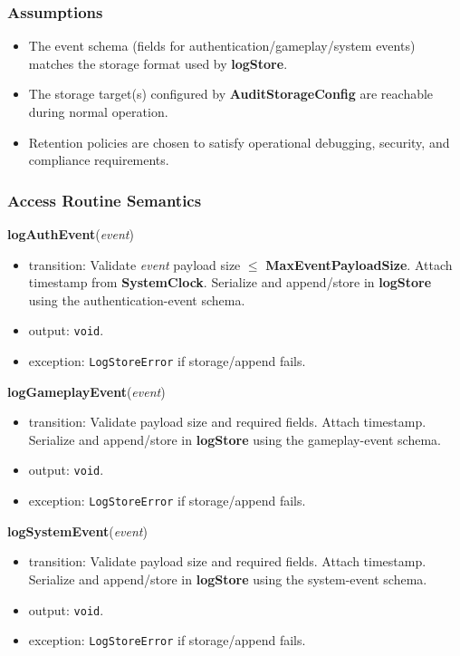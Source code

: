 \documentclass[12pt, titlepage]{article}
\begin{document}
\subsubsection{Assumptions}
\begin{itemize}
    \item The event schema (fields for authentication/gameplay/system events) matches the storage format used by \textbf{logStore}.
    \item The storage target(s) configured by \textbf{AuditStorageConfig} are reachable during normal operation.
    \item Retention policies are chosen to satisfy operational debugging, security, and compliance requirements.
\end{itemize}

\subsubsection{Access Routine Semantics}

\noindent\textbf{logAuthEvent}(\textit{event})
\begin{itemize}
    \item transition: Validate \textit{event} payload size $\le$ \textbf{MaxEventPayloadSize}. Attach timestamp from \textbf{SystemClock}. Serialize and append/store in \textbf{logStore} using the authentication-event schema.
    \item output: \texttt{void}.
    \item exception: \texttt{LogStoreError} if storage/append fails.
\end{itemize}

\noindent\textbf{logGameplayEvent}(\textit{event})
\begin{itemize}
    \item transition: Validate payload size and required fields. Attach timestamp. Serialize and append/store in \textbf{logStore} using the gameplay-event schema.
    \item output: \texttt{void}.
    \item exception: \texttt{LogStoreError} if storage/append fails.
\end{itemize}

\noindent\textbf{logSystemEvent}(\textit{event})
\begin{itemize}
    \item transition: Validate payload size and required fields. Attach timestamp. Serialize and append/store in \textbf{logStore} using the system-event schema.
    \item output: \texttt{void}.
    \item exception: \texttt{LogStoreError} if storage/append fails.
\end{itemize}
\end{document}
